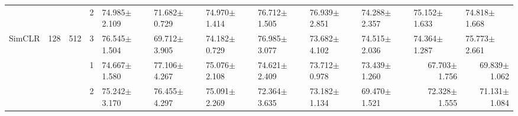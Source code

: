 \begin{table}[htpb]
{\begin{tabular}{c|c|c|c|ll|ll|ll|ll}
                                 &                                                                                 &                                                                                        & 2                                                                                         & 74.985$\pm$2.109                        & 71.682$\pm$0.729                        & 74.970$\pm$1.414                        & 76.712$\pm$1.505                        & 76.939$\pm$2.851                        & 74.288$\pm$2.357                        & 75.152$\pm$1.633                        & 74.818$\pm$1.668                       \\
\multirow{-12}{*}{SimCLR}        & \multirow{-6}{*}{128}                                                           & \multirow{-3}{*}{512}                                                                  & 3                                                                                         & 76.545$\pm$1.504                        & 69.712$\pm$3.905                        & 74.182$\pm$0.729                        & 76.985$\pm$3.077                        & 73.682$\pm$4.102                        & 74.515$\pm$2.036                        & 74.364$\pm$1.287                        & 75.773$\pm$2.661                       \\ \hline
                                 &                                                                                 &                                                                                        & 1                                                                                         & 74.667$\pm$1.580                        & 77.106$\pm$4.267                        & 75.076$\pm$2.108                        & 74.621$\pm$2.409                        & 73.712$\pm$0.978                        & 73.439$\pm$1.260                        & \multicolumn{1}{r}{67.703$\pm$1.756}    & \multicolumn{1}{r}{69.839$\pm$1.062}   \\
                                 &                                                                                 &                                                                                        & 2                                                                                         & 75.242$\pm$3.170                        & 76.455$\pm$4.297                        & 75.091$\pm$2.269                        & 72.364$\pm$3.635                        & 73.182$\pm$1.134                        & 69.470$\pm$1.521                        & \multicolumn{1}{r}{72.328$\pm$1.555}    & \multicolumn{1}{r}{71.131$\pm$1.084}   \\

\end{tabular}}
\end{table}
